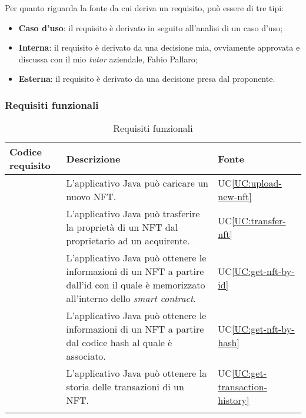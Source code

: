 \noindent Per quanto riguarda la fonte da cui deriva un requisito, può essere di tre tipi:
\begin{itemize}
  \item \textbf{Caso d'uso}: il requisito è derivato in seguito all'analisi di un caso d'uso;
  \item \textbf{Interna}: il requisito è derivato da una decisione mia, ovviamente approvata e discussa con il mio \textit{tutor} aziendale, Fabio Pallaro;
  \item \textbf{Esterna}: il requisito è derivato da una decisione presa dal proponente. 
\end{itemize}

\subsubsection{Requisiti funzionali}
\begin{longtabu}{|X[0.8,c]|X[3,c]|X[0.5,c]|}
  \hline 

  \textbf{Codice requisito} & \textbf{Descrizione} & \textbf{Fonte} \\ 

  \hline

   & L'applicativo Java può caricare un nuovo NFT. & UC\ref{UC:upload-new-nft} \\
  
  \hline

   & L'applicativo Java può trasferire la proprietà di un NFT dal proprietario ad un acquirente. & UC\ref{UC:transfer-nft} \\ 
  
  \hline

   & L'applicativo Java può ottenere le informazioni di un NFT a partire dall'id con il quale è memorizzato all'interno dello \textit{smart contract}. & UC\ref{UC:get-nft-by-id} \\ 
  
  \hline

   & L'applicativo Java può ottenere le informazioni di un NFT a partire dal codice hash al quale è associato. & UC\ref{UC:get-nft-by-hash} \\ 
  
  \hline

   & L'applicativo Java può ottenere la storia delle transazioni di un NFT. & UC\ref{UC:get-transaction-history} \\ 
  
  \hline

  \caption{Requisiti funzionali}
\end{longtabu}

